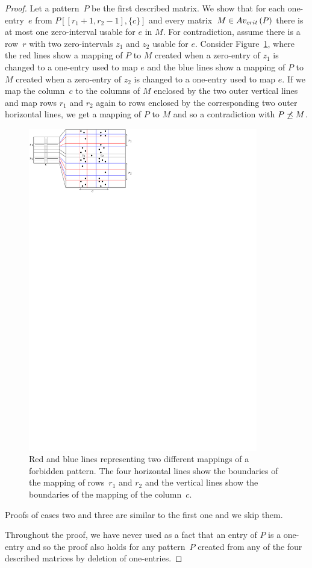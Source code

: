 \begin{proof}
Let a pattern~$P$ be the first described matrix. We show that for each one-entry~$e$ from $P[[r_1+1,r_2-1],\{c\}]$ and every matrix~$M\in Av_{crit}\left(P\right)$ there is at most one zero-interval usable for $e$ in $M$. For contradiction, assume there is a row~$r$ with two zero-intervals $z_1$ and $z_2$ usable for $e$. Consider Figure~\ref{fig:lemmaI1}, where the red lines show a mapping of $P$ to $M$ created when a zero-entry of $z_1$ is changed to a one-entry used to map $e$ and the blue lines show a mapping of $P$ to $M$ created when a zero-entry of $z_2$ is changed to a one-entry used to map $e$. If we map the column~$c$ to the columns of $M$ enclosed by the two outer vertical lines and map rows $r_1$ and $r_2$ again to rows enclosed by the corresponding two outer horizontal lines, we get a mapping of $P$ to $M$ and so a contradiction with $P\not\preceq M$.

\begin{figure}[!ht]
\centering
\includegraphics[width=100mm]{img/lemmaI1col.pdf}
\caption{Red and blue lines representing two different mappings of a forbidden pattern. The four horizontal lines show the boundaries of the mapping of rows~$r_1$ and $r_2$ and the vertical lines show the boundaries of the mapping of the column~$c$.}
\label{fig:lemmaI1}
\end{figure}
Proofs of cases two and three are similar to the first one and we skip them.

Throughout the proof, we have never used as a fact that an entry of $P$ is a one-entry and so the proof also holds for any pattern~$P$ created from any of the four described matrices by deletion of one-entries.
\end{proof}

